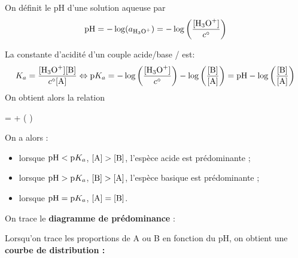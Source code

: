 \documentclass{cours}
\begin{document}
\newcommand{\pH}{\mathrm{pH}}
\begin{definition}
  On définit le $\pH$ d'une solution aqueuse par
  \begin{equation}
    \pH = -\log(a_{\ce{H3O+}}) = - \log \left( \frac{[\ce{H3O+}]}{c^\circ} \right) 
  \end{equation}
\end{definition}
La constante d'acidité d'un couple acide/base / est:
\begin{equation}
  K_a = \frac{[\ce{H3O+][\ce{B}]}}{c^\circ[\ce{A}]} \Leftrightarrow \pKa = -\log\left( \frac{[\ce{H3O+}]}{c^\circ}  \right) - \log\left( \frac{[\ce{B}]}{[\ce{A}]} \right) = \pH - \log\left( \frac{[\ce{B}]}{[\ce{A}]} \right) 
\end{equation}
On obtient alors la relation
\begin{eqencadre}
 \pH = \pKa + \log\left( \frac{[\ce{B}]}{[\ce{A}]}\right) 
\end{eqencadre}
On a alors :
\begin{itemize}
  \item lorsque $\pH<\pKa$, $[\ce{A}]>[\ce{B}]$, l'espèce acide  est prédominante ;  
  \item lorsque $\pH>\pKa$, $[\ce{B}]>[\ce{A}]$, l'espèce basique  est prédominante ;
  \item lorsque $\pH = \pKa$, $[\ce{A}] = [\ce{B}]$.   
\end{itemize}
On trace le \textbf{diagramme de prédominance} :
\begin{center}
\end{center}
%
Lorsqu'on trace les proportions de A ou B en fonction du $\pH$, on obtient une \textbf{courbe de distribution :}
\end{document}

